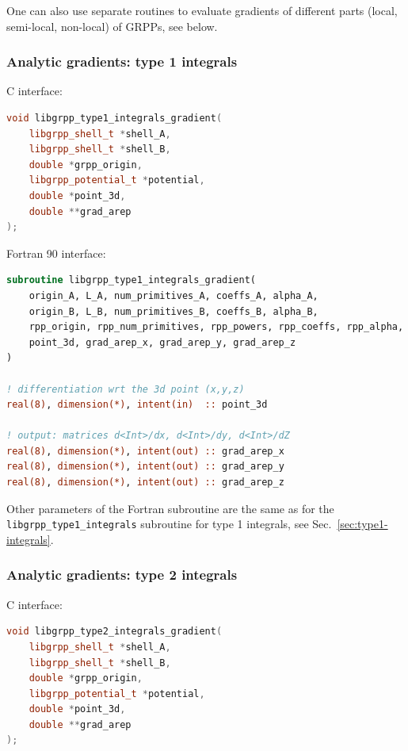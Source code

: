 \documentclass[12pt]{article}
\begin{document}
One can also use separate routines to evaluate gradients of different parts (local, semi-local, non-local) of GRPPs, see below.

\subsubsection{Analytic gradients: type 1 integrals}
\label{sec:type1-grad}

C interface:

\begin{lstlisting}[language=C++]
void libgrpp_type1_integrals_gradient(
    libgrpp_shell_t *shell_A,
    libgrpp_shell_t *shell_B,
    double *grpp_origin,
    libgrpp_potential_t *potential,
    double *point_3d,
    double **grad_arep
);
\end{lstlisting}

\noindent
Fortran 90 interface:

\begin{lstlisting}[language=Fortran]
subroutine libgrpp_type1_integrals_gradient(                           &
    origin_A, L_A, num_primitives_A, coeffs_A, alpha_A,                &
    origin_B, L_B, num_primitives_B, coeffs_B, alpha_B,                &
    rpp_origin, rpp_num_primitives, rpp_powers, rpp_coeffs, rpp_alpha, &
    point_3d, grad_arep_x, grad_arep_y, grad_arep_z                    &
)

! differentiation wrt the 3d point (x,y,z)
real(8), dimension(*), intent(in)  :: point_3d

! output: matrices d<Int>/dx, d<Int>/dy, d<Int>/dZ
real(8), dimension(*), intent(out) :: grad_arep_x
real(8), dimension(*), intent(out) :: grad_arep_y
real(8), dimension(*), intent(out) :: grad_arep_z
\end{lstlisting}
Other parameters of the Fortran subroutine are the same as for the \texttt{libgrpp\_type1\_integrals} subroutine for type 1 integrals, see Sec.~\ref{sec:type1-integrals}.

\subsubsection{Analytic gradients: type 2 integrals}
\label{sec:type2-grad}

C interface:

\begin{lstlisting}[language=C++]
void libgrpp_type2_integrals_gradient(
    libgrpp_shell_t *shell_A,
    libgrpp_shell_t *shell_B,
    double *grpp_origin,
    libgrpp_potential_t *potential,
    double *point_3d,
    double **grad_arep
);
\end{lstlisting}
\end{document}
